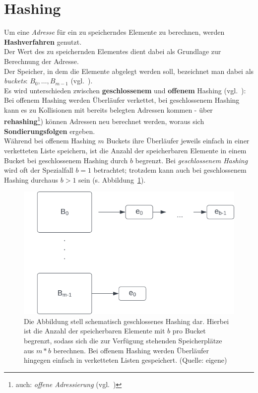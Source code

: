 \section{Hashing}
Um eine \textit{Adresse} für ein zu speicherndes Elemente zu berechnen, werden \textbf{Hashverfahren} genutzt.\\
Der Wert des zu speichernden Elementes dient dabei als Grundlage zur Berechnung der Adresse.\\
Der Speicher, in dem die Elemente abgelegt werden soll, bezeichnet man dabei als \textit{buckets}: $B_0,\dots , B_{m - 1}$ (vgl.~\cite[115]{GD18d}).\\

\noindent
Es wird unterschieden zwischen \textbf{geschlossenem} und \textbf{offenem} Hashing (vgl.~\cite[116]{GD18d}): Bei offenem Hashing werden Überläufer verkettet, bei geschlossenem Hashing kann es zu Kollisionen mit bereits belegten Adressen kommen - über \textbf{rehashing}\footnote{
auch: \textit{offene Adressierung} (vgl.~\cite[119]{GD18d})
}) können Adressen neu berechnet werden, woraus sich \textbf{Sondierungsfolgen} ergeben.\\

\noindent
Während bei offenem Hashing $m$ Buckets ihre Überläufer jeweils einfach in einer verketteten Liste speichern, ist die Anzahl der speicherbaren Elemente in einem Bucket bei geschlossenem Hashing durch $b$ begrenzt.
Bei \textit{geschlossenem Hashing} wird oft der Spezialfall $b = 1$ betrachtet; trotzdem kann auch bei geschlossenem Hashing durchaus $b > 1$ sein (s. Abbildung~\ref{fig:openaddressing}).\\

\begin{figure}
\begin{center}
\includegraphics[scale=0.4]{chapters/Datenstrukturen und Algorithmen/img/openaddressing}
\caption{Die Abbildung stell schematisch geschlossenes Hashing dar. Hierbei ist die Anzahl der speicherbaren Elemente mit $b$ pro Bucket begrenzt, sodass sich die zur Verfügung stehenden Speicherplätze aus $m * b$ berechnen. Bei offenem Hashing werden Überläufer hingegen einfach in verketteten Listen gespeichert. (Quelle: eigene)}
\label{fig:openaddressing}
\end{center}
\end{figure}

